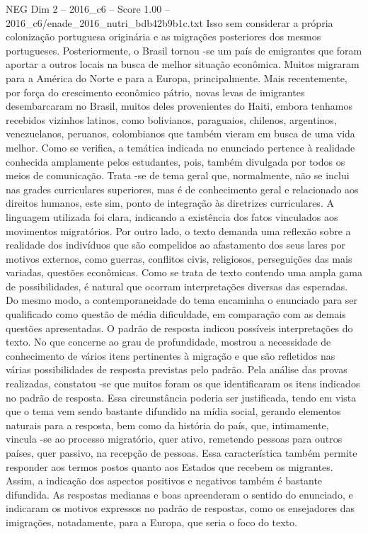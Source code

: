 \begin{textsample}{NEG Dim 2 – 2016\_c6 – Score 1.00 – 2016\_c6/enade\_2016\_nutri\_bdb42b9b1c.txt}
Isso sem considerar a própria colonização portuguesa originária e as migrações posteriores dos mesmos portugueses.
Posteriormente, o Brasil tornou -se um país de emigrantes que foram aportar a outros locais na busca de melhor situação econômica.
Muitos migraram para a América do Norte e para a Europa, principalmente.
Mais recentemente, por força do crescimento econômico pátrio, novas levas de imigrantes desembarcaram no Brasil, muitos deles provenientes do Haiti, embora tenhamos recebidos vizinhos latinos, como bolivianos, paraguaios, chilenos, argentinos, venezuelanos, peruanos, colombianos que também vieram em busca de uma vida melhor.
Como se verifica, a temática indicada no enunciado pertence à realidade conhecida amplamente pelos estudantes, pois, também divulgada por todos os meios de comunicação.
Trata -se de tema geral que, normalmente, não se inclui nas grades curriculares superiores, mas é de conhecimento geral e relacionado aos direitos humanos, este sim, ponto de integração às diretrizes curriculares.
A linguagem utilizada foi clara, indicando a existência dos fatos vinculados aos movimentos migratórios.
Por outro lado, o texto demanda uma reflexão sobre a realidade dos indivíduos que são compelidos ao afastamento dos seus lares por motivos externos, como guerras, conflitos civis, religiosos, perseguições das mais variadas, questões econômicas.
Como se trata de texto contendo uma ampla gama de possibilidades, é natural que ocorram interpretações diversas das esperadas.
Do mesmo modo, a contemporaneidade do tema encaminha o enunciado para ser qualificado como questão de média dificuldade, em comparação com as demais questões apresentadas.
O padrão de resposta indicou possíveis interpretações do texto.
No que concerne ao grau de profundidade, mostrou a necessidade de conhecimento de vários itens pertinentes à migração e que são refletidos nas várias possibilidades de resposta previstas pelo padrão.
Pela análise das provas realizadas, constatou -se que muitos foram os que identificaram os itens indicados no padrão de resposta.
Essa circunstância poderia ser justificada, tendo em vista que o tema vem sendo bastante difundido na mídia social, gerando elementos naturais para a resposta, bem como da história do país, que, intimamente, vincula -se ao processo migratório, quer ativo, remetendo pessoas para outros países, quer passivo, na recepção de pessoas.
Essa característica também permite responder aos termos postos quanto aos Estados que recebem os migrantes.
Assim, a indicação dos aspectos positivos e negativos também é bastante difundida.
As respostas medianas e boas apreenderam o sentido do enunciado, e indicaram os motivos expressos no padrão de respostas, como os ensejadores das imigrações, notadamente, para a Europa, que seria o foco do texto.

\end{textsample}
